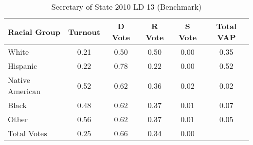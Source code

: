 \begin{table}[htb]
\begin{center}
\caption{Secretary of State 2010 LD 13 (Benchmark)}
\label{sos10_vap_ld_13_benchmark}
\begin{tabular}{lccccc}
  \hline
Racial Group & Turnout & D Vote & R Vote & S Vote & Total VAP \\ 
  \hline
White & 0.21 & 0.50 & 0.50 & 0.00 & 0.35 \\ 
  Hispanic & 0.22 & 0.78 & 0.22 & 0.00 & 0.52 \\ 
  Native American & 0.52 & 0.62 & 0.36 & 0.02 & 0.02 \\ 
  Black & 0.48 & 0.62 & 0.37 & 0.01 & 0.07 \\ 
  Other & 0.56 & 0.62 & 0.37 & 0.01 & 0.05 \\ 
  Total Votes & 0.25 & 0.66 & 0.34 & 0.00 &  \\ 
   \hline
\end{tabular}
\end{center}
\end{table}
